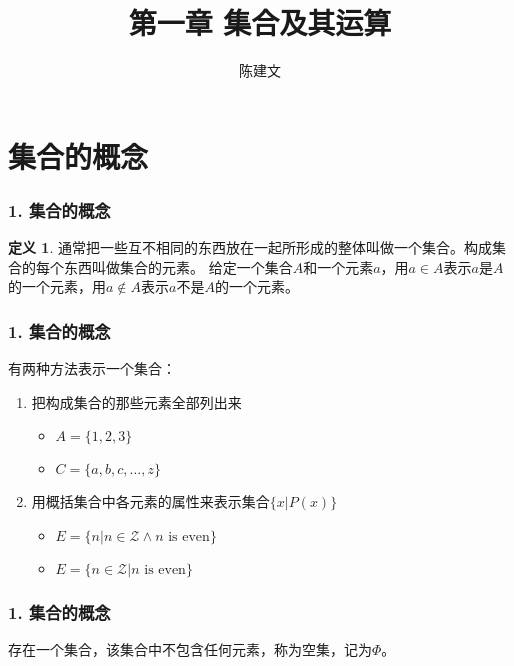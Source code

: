 \documentclass{beamer}
\begin{document}
\begin{CJK*}{UTF8}{gbsn}

\newtheorem{Thm}{定理}[section]
\theoremstyle{definition}
\newtheorem{Def}{定义}[section]
\theoremstyle{example}
\newtheorem*{Ex}{例：}
\date{}
\author{陈建文}

\title{第一章 集合及其运算}
\begin{frame}
  \titlepage
\end{frame}  
\section{集合的概念}
\begin{frame}
  \frametitle{1. 集合的概念}
  \begin{Def}
    通常把一些互不相同的东西放在一起所形成的整体叫做一个\alert{集合}。构成集合的每个东西叫做集合的\alert{元素}。
给定一个集合$A$和一个元素$a$，用\alert{$a \in A$}表示$a$是$A$的一个元素，用\alert{$a \notin A$}表示$a$不是$A$的一个元素。
  \end{Def}
\end{frame}

\begin{frame}
  \frametitle{1. 集合的概念}

有两种方法表示一个集合：
\begin{enumerate}
\item 把构成集合的那些元素全部列出来
  \begin{itemize}
\pause
  \item $A = \{1, 2, 3\}$
\pause
\item $C = \{a, b, c, \ldots, z\}$
  \end{itemize}
\pause
\item 用概括集合中各元素的属性来表示集合$\{x|P(x)\}$
\begin{itemize}
\pause
\item $E = \{n|n \in \mathcal{Z} \land n\text{ is even}\}$
\pause
\item $E = \{n \in \mathcal{Z} | n\text{ is even}\}$
\end{itemize}
\end{enumerate}


\end{frame}

\begin{frame}
  \frametitle{1. 集合的概念}

存在一个集合，该集合中不包含任何元素，称为\alert{空集}，记为$\Phi$。

\end{frame}


\end{CJK*}
\end{document}

